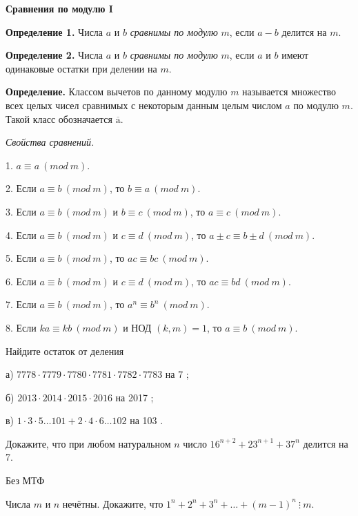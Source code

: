 \centerline{\bf \Huge Сравнения по модулю I}

\textbf{Определение 1.} Числа $a$ и $b$ \textit{сравнимы по модулю} $m$, если $a-b$ делится на $m$.

\textbf{Определение 2.} Числа $a$ и $b$ \textit{сравнимы по модулю} $m$, если $a$ и $b$ имеют одинаковые остатки при делении на $m$.

\textbf{Определение.} Классом вычетов по данному модулю $m$ называется множество всех целых чисел сравнимых с некоторым данным целым числом $a$ по модулю $m$. Такой класс обозначается $\overline{\mathrm{a}}$.

\centerline{\it Свойства сравнений.}

1. $a \equiv a\ (mod\ m)$.

2. Если $a \equiv b\ (mod\ m)$, то $b \equiv a\ (mod\ m)$.

3. Если $a \equiv b\ (mod\ m)$ и $b \equiv c\ (mod\ m)$, то $a \equiv c\ (mod\ m)$.

4. Если $a \equiv b\ (mod\ m)$ и $c \equiv d\ (mod\ m)$, то $a \pm c \equiv b \pm d\ (mod\ m)$.

5. Если $a \equiv b\ (mod\ m)$, то $a c \equiv b c\ (mod\ m)$.

6. Если $a \equiv b\ (mod\ m)$ и $c \equiv d\ (mod\ m)$, то $a c \equiv b d\ (mod\ m)$.

7. Если $a \equiv b\ (mod\ m)$, то $a^n \equiv b^n\ (mod\ m)$.

8. Если $k a \equiv k b\ (mod\ m)$ и НОД $(k, m)=1$, то $a \equiv b\ (mod\ m)$.

Найдите остаток от деления

а) $7778 \cdot 7779 \cdot 7780 \cdot 7781 \cdot 7782 \cdot 7783$ на 7 ;

б) $2013 \cdot 2014 \cdot 2015 \cdot 2016$ на 2017 ;

в) $1 \cdot 3 \cdot 5 \ldots 101+2 \cdot 4 \cdot 6 \ldots 102$ на 103 .


Докажите, что при любом натуральном $n$ число $16^{n+2}+23^{n+1}+37^n$ делится на 7.

\begin{flushright}
        \scriptsize{Без МТФ}
\end{flushright}

Числа $m$ и $n$ нечётны. Докажите, что $1^n+2^n+3^n+\ldots+(m-1)^n \ \vdots \ m$.

\newpage

\hspace{3mm}

